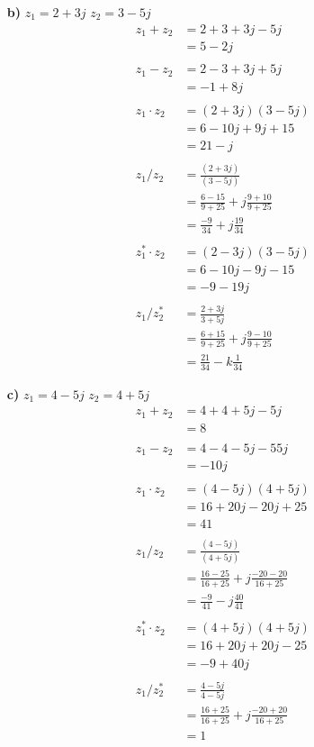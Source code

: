 \documentclass[a4paper,11pt]{article}
\begin{document}
\begin{enumerate}
\begin{enumerate}
\begin{enumerate}
			\item[\textbf{b)}] $z_1 = 2+3j$ $z_2=3-5j$			
			\begin{align*}
			z_1+z_2 &= 2+3+3j-5j \\
					&= 5-2j \\\\
			z_1-z_2 &= 2-3+3j+5j \\
					&= -1+8j \\\\
			z_1 \cdot z_2 &= (2+3j)(3-5j) \\
			              &= 6-10j+9j+15 \\
			              &= 21-j \\\\
			z_1 / z_2 &= \frac{(2+3j)}{(3-5j)} \\
			          &= \frac{6-15}{9+25}+j\frac{9+10}{9+25} \\
			          &= \frac{-9}{34}+j\frac{19}{34} \\\\
			z_1^* \cdot z_2 &= (2-3j)(3-5j) \\
			              	&= 6-10j-9j-15 \\
			              	&= -9-19j \\\\
			z_1 / z_2^* &= \frac{2+3j}{3+5j}\\
						&= \frac{6+15}{9+25} + j\frac{9-10}{9+25} \\
						&= \frac{21}{34}-k\frac{1}{34}
			\end{align*}
			
			\item[\textbf{c)}] $z_1 = 4-5j$ $z_2=4+5j$
			\begin{align*}
			z_1+z_2 &= 4+4+5j-5j \\
					&= 8 \\\\
			z_1-z_2 &= 4-4-5j-55j \\
					&= -10j \\\\
			z_1 \cdot z_2 &= (4-5j)(4+5j) \\
			              &= 16+20j-20j+25 \\
			              &= 41 \\\\
			z_1 / z_2 &= \frac{(4-5j)}{(4+5j)} \\
			          &= \frac{16-25}{16+25}+j\frac{-20-20}{16+25} \\
			          &= \frac{-9}{41}-j\frac{40}{41} \\\\
			z_1^* \cdot z_2 &= (4+5j)(4+5j) \\
			              	&= 16+20j+20j-25 \\
			              	&= -9+40j \\\\
			z_1 / z_2^* &= \frac{4-5j}{4-5j}\\
						&= \frac{16+25}{16+25} + j\frac{-20+20}{16+25} \\
						&= 1
			\end{align*}
			

\end{enumerate}
\end{enumerate}
\end{enumerate}
\end{document}
